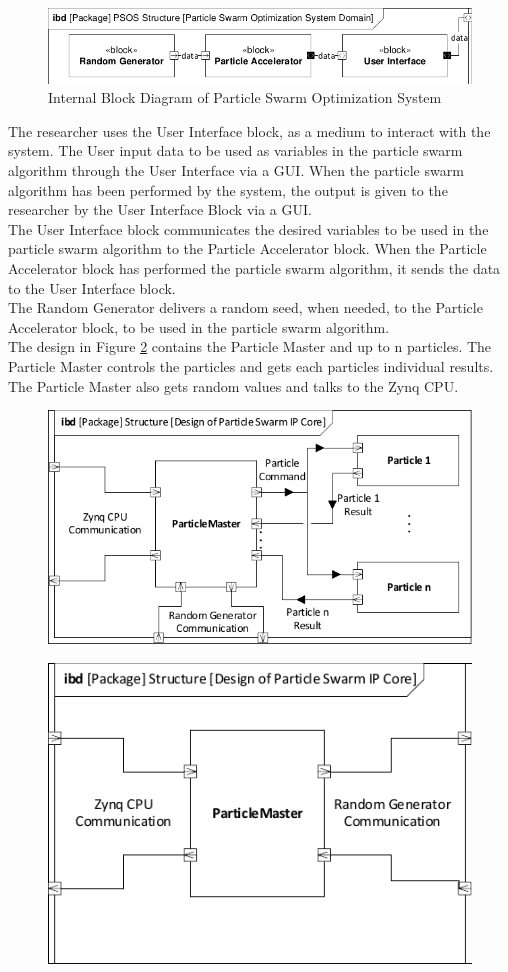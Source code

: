 \begin{figure}[H]
	\centering
	\includegraphics[width=0.8\linewidth]{diagram/ibd_particle_swarm_optimization_system.pdf}
	\caption{Internal Block Diagram of Particle Swarm Optimization System}
	\label{fig:ibd}
\end{figure}

The researcher uses the User Interface block, as a medium to interact with the system. The User input data to be used as variables in the particle swarm algorithm through the User Interface via a GUI. When the particle swarm algorithm has been performed by the system, the output is given to the researcher by the User Interface Block via a GUI.\\

The User Interface block communicates the desired variables to be used in the particle swarm algorithm to the Particle Accelerator block. When the Particle Accelerator block has performed the particle swarm algorithm, it sends the data to the User Interface block.\\

The Random Generator delivers a random seed, when needed, to the Particle Accelerator block, to be used in the particle swarm algorithm.\\


The design in Figure \ref{fig:ibdpsosarchitecture1} contains the Particle Master and up to n particles. The Particle Master controls the particles and gets each particles individual results. The Particle Master also gets random values and talks to the Zynq CPU.
\begin{figure}[H]
	\centering
	\includegraphics[width=0.7\linewidth]{diagram/ibd_psos_architecture1}
	\caption{}
	\label{fig:ibdpsosarchitecture1}
\end{figure}



\begin{figure}[H]
	\centering
	\includegraphics[width=0.7\linewidth]{diagram/ibd_psos_architecture2}
	\caption{}
	\label{fig:ibdpsosarchitecture2}
\end{figure}

